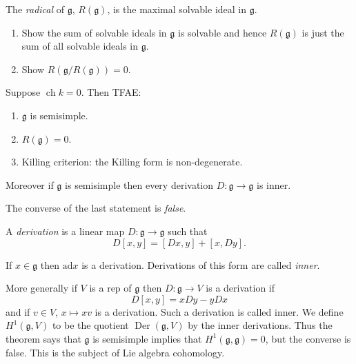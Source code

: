 \documentclass[a4paper]{article}
\newcommand*{\Lie}[1]{\mathfrak{#1}} %
\newcommand{\ad}{\mathrm{ad}} %
\DeclareMathOperator{\cha}{ch} %
\begin{document}
\begin{definition}[radical]
  The \emph{radical} of \(\Lie g\), \(R(\Lie g)\), is the maximal solvable ideal in \(\Lie g\).
\end{definition}

\begin{ex}\leavevmode
  \begin{enumerate}
  \item Show the sum of solvable ideals in \(\Lie g\) is solvable and hence \(R(\Lie g)\) is just the sum of all solvable ideals in \(\Lie g\).
  \item Show \(R(\Lie g/R(\Lie g)) = 0\).
  \end{enumerate}
\end{ex}

\begin{theorem}
  \label{thm:semisimplicity criteria}
  Suppose \(\cha k = 0\). Then TFAE:
  \begin{enumerate}
  \item \(\Lie g\) is semisimple.
  \item \(R(\Lie g) = 0\).
  \item Killing criterion: the Killing form is non-degenerate.
  \end{enumerate}
  Moreover if \(\Lie g\) is semisimple then every derivation \(D: \Lie g \to \Lie g\) is inner.
\end{theorem}
The converse of the last statement is \emph{false}.

\begin{definition}[derivation]
  A \emph{derivation} is a linear map \(D: \Lie g \to \Lie g\) such that
  \[
    D[x, y] = [Dx, y] + [x, Dy].
  \]
\end{definition}

\begin{eg}
  If \(x \in \Lie g\) then \(\ad x\) is a derivation. Derivations of this form are called \emph{inner}.
\end{eg}

More generally if \(V\) is a rep of \(\Lie g\) then \(D: \Lie g \to V\) is a derivation if
\[
  D[x, y] = x Dy - y Dx
\]
and if \(v \in V\), \(x \mapsto xv\) is a derivation. Such a derivation is called inner. We define \(H^1(\Lie g, V)\) to be the quotient \(\operatorname{Der}(\Lie g, V)\) by the inner derivations. Thus the theorem says that \(\Lie g\) is semisimple implies that \(H^1(\Lie g, \Lie g) = 0\), but the converse is false. This is the subject of Lie algebra cohomology.
\end{document}
